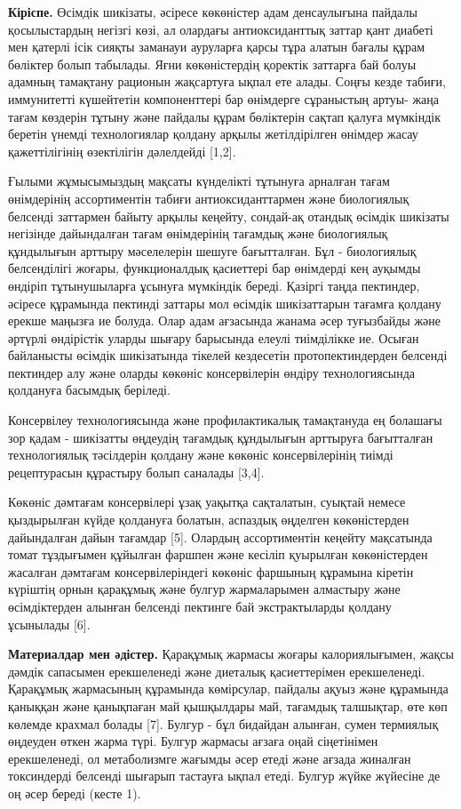 \begin{multicols}{2}
{\bfseries Кіріспе.} Өсімдік шикізаты, әсіресе көкөністер адам денсаулығына
пайдалы қосылыстардың негізгі көзі, ал олардағы антиоксиданттық заттар
қант диабеті мен қатерлі ісік сияқты заманауи ауруларға қарсы тұра
алатын бағалы құрам бөліктер болып табылады. Яғни көкөністердің қоректік
заттарға бай болуы адамның тамақтану рационын жақсартуға ықпал ете
алады. Соңғы кезде табиғи, иммунитетті күшейтетін компоненттері бар
өнімдерге сұраныстың артуы- жаңа тағам көздерін тұтыну және пайдалы
құрам бөліктерін сақтап қалуға мүмкіндік беретін үнемді технологиялар
қолдану арқылы жетілдірілген өнімдер жасау қажеттілігінің өзектілігін
дәлелдейді {[}1,2{]}.

Ғылыми жұмысымыздың мақсаты күнделікті тұтынуға арналған тағам
өнімдерінің ассортиментін табиғи антиоксиданттармен және биологиялық
белсенді заттармен байыту арқылы кеңейту, сондай-ақ отандық өсімдік
шикізаты негізінде дайындалған тағам өнімдерінің тағамдық және
биологиялық құндылығын арттыру мәселелерін шешуге бағытталған. Бұл -
биологиялық белсенділігі жоғары, функционалдық қасиеттері бар өнімдерді
кең ауқымды өндіріп тұтынушыларға ұсынуға мүмкіндік береді. Қазіргі
таңда пектиндер, әсіресе құрамында пектинді заттары мол өсімдік
шикізаттарын тағамға қолдану ерекше маңызға ие болуда. Олар адам
ағзасында жанама әсер туғызбайды және әртүрлі өндірістік уларды шығару
барысында елеулі тиімділікке ие. Осыған байланысты өсімдік шикізатында
тікелей кездесетін протопектиндерден белсенді пектиндер алу және оларды
көкөніс консервілерін өндіру технологиясында қолдануға басымдық
беріледі.

Консервілеу технологиясында және профилактикалық тамақтануда ең болашағы
зор қадам - шикізатты өңдеудің тағамдық құндылығын арттыруға бағытталған
технологиялық тәсілдерін қолдану және көкөніс консервілерінің тиімді
рецептурасын құрастыру болып саналады {[}3,4{]}.

Көкөніс дәмтағам консервілері ұзақ уақытқа сақталатын, суықтай немесе
қыздырылған күйде қолдануға болатын, аспаздық өңделген көкөністерден
дайындалған дайын тағамдар {[}5{]}. Олардың ассортиментін кеңейту
мақсатында томат тұздығымен құйылған фаршпен және кесіліп қуырылған
көкөністерден жасалған дәмтағам консервілеріндегі көкөніс фаршының
құрамына кіретін күріштің орнын қарақұмық және булгур жармаларымен
алмастыру және өсімдіктерден алынған белсенді пектинге бай
экстрактыларды қолдану ұсынылады {[}6{]}.

{\bfseries Материалдар мен әдістер.} Қарақұмық жармасы жоғары
калориялығымен, жақсы дәмдік сапасымен ерекшеленеді және диеталық
қасиеттерімен ерекшеленеді. Қарақұмық жармасының құрамында көмірсулар,
пайдалы ақуыз және құрамында қаныққан және қанықпаған май қышқылдары
май, тағамдық талшықтар, өте көп көлемде крахмал болады {[}7{]}. Булгур
- бұл бидайдан алынған, сумен термиялық өңдеуден өткен жарма түрі.
Булгур жармасы ағзаға оңай сіңетінімен ерекшеленеді, ол метаболизмге
жағымды әсер етеді және ағзада жиналған токсиндерді белсенді шығарып
тастауға ықпал етеді. Булгур жүйке жүйесіне де оң әсер береді (кесте 1).
\end{multicols}


